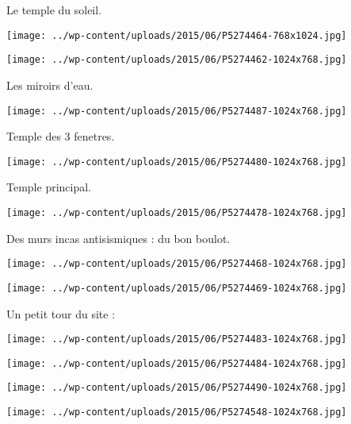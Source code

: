  \newline
 Le temple du soleil. \newline
 \newline
\centerline{\texttt{[image: ../wp-content/uploads/2015/06/P5274464-768x1024.jpg]} } 
 \newline
 \newline
\centerline{\texttt{[image: ../wp-content/uploads/2015/06/P5274462-1024x768.jpg]} } 
 \newline
 Les miroirs d'eau. \newline
 \newline
\centerline{\texttt{[image: ../wp-content/uploads/2015/06/P5274487-1024x768.jpg]} } 
 \newline
 Temple des 3 fenetres. \newline
 \newline
\centerline{\texttt{[image: ../wp-content/uploads/2015/06/P5274480-1024x768.jpg]} } 
 \newline
 Temple principal. \newline
 \newline
\centerline{\texttt{[image: ../wp-content/uploads/2015/06/P5274478-1024x768.jpg]} } 
 \newline
 Des murs incas antisismiques : du bon boulot. \newline
 \newline
\centerline{\texttt{[image: ../wp-content/uploads/2015/06/P5274468-1024x768.jpg]} } 
 \newline
 \newline
\centerline{\texttt{[image: ../wp-content/uploads/2015/06/P5274469-1024x768.jpg]} } 
 \newline
 Un petit tour du site : \newline
 \newline
\centerline{\texttt{[image: ../wp-content/uploads/2015/06/P5274483-1024x768.jpg]} } 
 \newline
 \newline
\centerline{\texttt{[image: ../wp-content/uploads/2015/06/P5274484-1024x768.jpg]} } 
 \newline
 \newline
\centerline{\texttt{[image: ../wp-content/uploads/2015/06/P5274490-1024x768.jpg]} } 
 \newline
 \newline
\centerline{\texttt{[image: ../wp-content/uploads/2015/06/P5274548-1024x768.jpg]} } 
